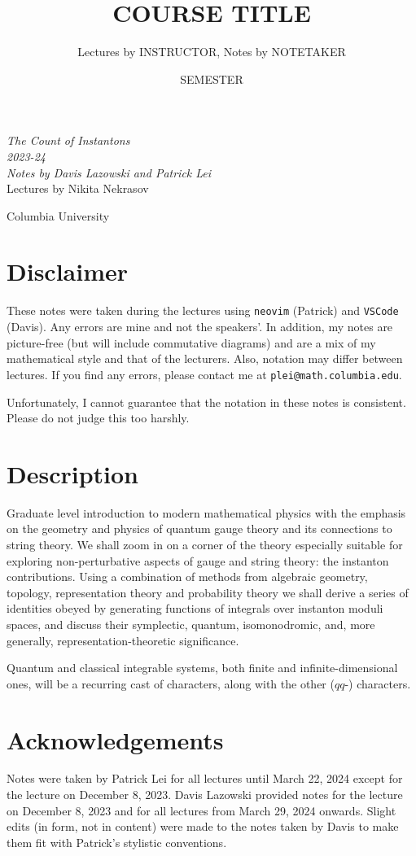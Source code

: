 \documentclass[leqno, openany]{memoir}
\title{COURSE TITLE}
\author{Lectures by INSTRUCTOR, Notes by NOTETAKER}
\date{SEMESTER}
\theoremstyle{definition}
\theoremstyle{remark}
\theoremstyle{plain}
\theoremstyle{definition}
\theoremstyle{remark}
\newcommand*{\titleSW}
    {\begingroup%
    \raggedleft
    \vspace*{\baselineskip}
    {\Huge\itshape The Count of Instantons \\ 2023-24}\\[\baselineskip]
    {\large\itshape Notes by Davis Lazowski and Patrick Lei}\\[0.2\textheight]
    {\Large Lectures by Nikita Nekrasov}\par
    \vfill
    {\Large \sffamily Columbia University}
    \vspace*{\baselineskip}
\endgroup}
\begin{document}
    
\begin{titlingpage}
\titleSW
\end{titlingpage}

\thispagestyle{empty}
\section*{Disclaimer}%
\label{sec:disclaimer}

These notes were taken during the lectures using \texttt{neovim} (Patrick) and \texttt{VSCode} (Davis). 
Any errors are mine and not the speakers'. 
In addition, my notes are picture-free (but will include commutative diagrams) and are a mix of my mathematical style and that of the lecturers. Also, notation may differ between lectures.
If you find any errors, please contact me at \texttt{plei@math.columbia.edu}.

Unfortunately, I cannot guarantee that the notation in these notes is consistent. Please do not judge this too harshly.

\section*{Description}

Graduate level introduction to modern mathematical physics with the emphasis on the geometry and physics of quantum gauge theory and its connections to string theory.  We shall zoom in on a corner of the theory especially suitable for exploring non-perturbative aspects of gauge and string theory: the instanton contributions. Using a combination of methods from algebraic geometry, topology, representation theory and probability theory we shall derive a series of identities obeyed by generating functions of integrals over instanton moduli spaces, and discuss their symplectic, quantum, isomonodromic, and, more generally, representation-theoretic significance.

Quantum and classical integrable systems, both finite and infinite-dimensional ones, will be a recurring cast of characters, along with the other ($qq$-) characters.

\section*{Acknowledgements}
Notes were taken by Patrick Lei for all lectures until March 22, 2024 except for the lecture on December 8, 2023. Davis Lazowski provided notes for the lecture on December 8, 2023 and for all lectures from March 29, 2024 onwards. Slight edits (in form, not in content) were made to the notes taken by Davis to make them fit with Patrick's stylistic conventions.
\end{document}
